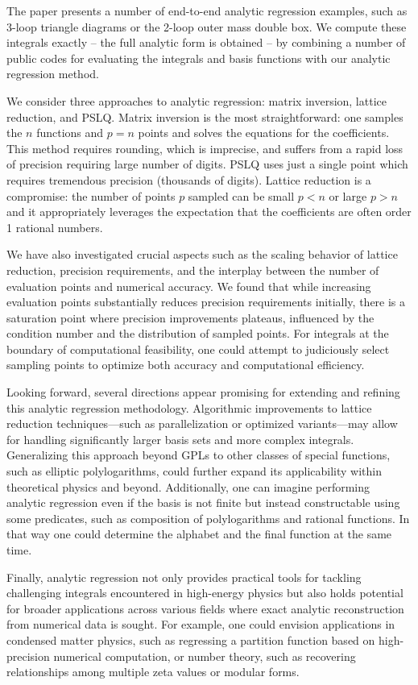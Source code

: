 \documentclass[a4paper,11pt]{article}
\begin{document}
The paper presents a number of end-to-end analytic regression examples, such as 3-loop triangle diagrams or the 2-loop outer mass double box. We compute these integrals exactly --  the full analytic form is obtained -- by combining a number of public codes for evaluating the integrals and basis functions with our analytic regression method. 

We consider three approaches to analytic regression: matrix inversion, lattice reduction, and PSLQ. Matrix inversion is the most straightforward: one samples the $n$ functions and $p=n$ points and solves the equations for the coefficients. This method requires rounding, which is imprecise, and suffers from a rapid loss of precision requiring large number of digits. PSLQ uses just a single point which requires tremendous precision (thousands of digits). Lattice reduction is a compromise: the number of points $p$ sampled can be small $p<n$ or large $p>n$ and it appropriately leverages the expectation that the coefficients are often order 1 rational numbers. 

We have also investigated crucial aspects such as the scaling behavior of lattice reduction, precision requirements, and the interplay between the number of evaluation points and numerical accuracy. We found that while increasing evaluation points substantially reduces precision requirements initially, there is a saturation point where precision improvements plateaus, influenced by the condition number and the distribution of sampled points. For integrals at the boundary of computational feasibility, one could attempt to judiciously select sampling points to optimize both accuracy and computational efficiency.

Looking forward, several directions appear promising for extending and refining this analytic regression methodology. Algorithmic improvements to lattice reduction techniques—such as parallelization or optimized variants—may allow for handling significantly larger basis sets and more complex integrals. Generalizing this approach beyond GPLs to other classes of special functions, such as elliptic polylogarithms, could further expand its applicability within theoretical physics and beyond. Additionally, one can imagine performing analytic regression even if the basis is not finite but instead constructable using some predicates, such as composition of polylogarithms and rational functions. In that way one could determine the alphabet and the final function at the same time. 

Finally, analytic regression not only provides practical tools for tackling challenging integrals encountered in high-energy physics but also holds potential for broader applications across various fields where exact analytic reconstruction from numerical data is sought. For example, one could envision applications in condensed matter physics, such as regressing a partition function based on high-precision numerical computation, or number theory, such as recovering relationships among multiple zeta values or modular forms.
\end{document}
